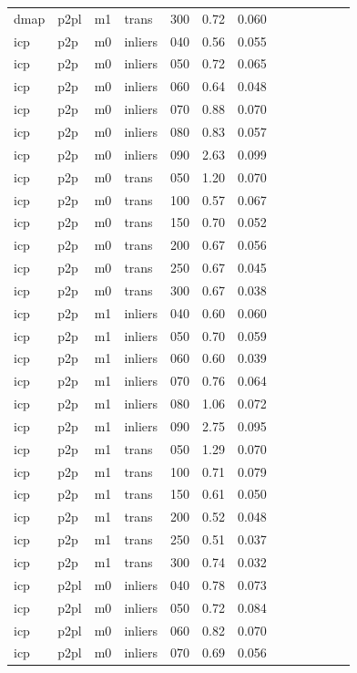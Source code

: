 \begin{table}[htbp]
\begin{tabular}{lllllrrrrrrrr}
  dmap & p2pl & m1 & trans & 300 & 0.72 & 0.060 \\
  icp & p2p & m0 & inliers & 040 & 0.56 & 0.055 \\
  icp & p2p & m0 & inliers & 050 & 0.72 & 0.065 \\
  icp & p2p & m0 & inliers & 060 & 0.64 & 0.048 \\
  icp & p2p & m0 & inliers & 070 & 0.88 & 0.070 \\
  icp & p2p & m0 & inliers & 080 & 0.83 & 0.057 \\
  icp & p2p & m0 & inliers & 090 & 2.63 & 0.099 \\
  icp & p2p & m0 & trans & 050 & 1.20 & 0.070 \\
  icp & p2p & m0 & trans & 100 & 0.57 & 0.067 \\
  icp & p2p & m0 & trans & 150 & 0.70 & 0.052 \\
  icp & p2p & m0 & trans & 200 & 0.67 & 0.056 \\
  icp & p2p & m0 & trans & 250 & 0.67 & 0.045 \\
  icp & p2p & m0 & trans & 300 & 0.67 & 0.038 \\
  icp & p2p & m1 & inliers & 040 & 0.60 & 0.060 \\
  icp & p2p & m1 & inliers & 050 & 0.70 & 0.059 \\
  icp & p2p & m1 & inliers & 060 & 0.60 & 0.039 \\
  icp & p2p & m1 & inliers & 070 & 0.76 & 0.064 \\
  icp & p2p & m1 & inliers & 080 & 1.06 & 0.072 \\
  icp & p2p & m1 & inliers & 090 & 2.75 & 0.095 \\
  icp & p2p & m1 & trans & 050 & 1.29 & 0.070 \\
  icp & p2p & m1 & trans & 100 & 0.71 & 0.079 \\
  icp & p2p & m1 & trans & 150 & 0.61 & 0.050 \\
  icp & p2p & m1 & trans & 200 & 0.52 & 0.048 \\
  icp & p2p & m1 & trans & 250 & 0.51 & 0.037 \\
  icp & p2p & m1 & trans & 300 & 0.74 & 0.032 \\
  icp & p2pl & m0 & inliers & 040 & 0.78 & 0.073 \\
  icp & p2pl & m0 & inliers & 050 & 0.72 & 0.084 \\
  icp & p2pl & m0 & inliers & 060 & 0.82 & 0.070 \\
  icp & p2pl & m0 & inliers & 070 & 0.69 & 0.056 \\

\end{tabular}
\end{table}
